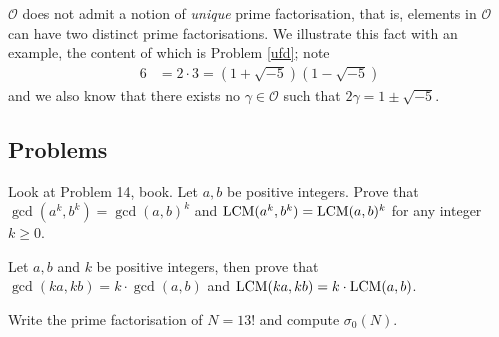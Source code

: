 
$\mathscr{O}$ does not admit a notion of \emph{unique} prime factorisation, that is, elements in $\mathscr{O}$ can have two distinct prime factorisations. We illustrate this fact with an example, the content of which is Problem \ref{ufd}; note
\begin{align*}
6 &= 2\cdot 3 = (1 + \sqrt{-5})(1- \sqrt{-5})
\end{align*}
and we also know that there exists no $\gamma \in \mathscr{O}$ such that $2\gamma = 1 \pm \sqrt{-5}$.

\vspace*{0.5in}

\subsection{Problems}
\vspace{0.1in}

\begin{problem}\label{problem 3.1}
Look at Problem 14, book.
Let $a,b$ be positive integers. Prove that $\gcd(a^k,b^k) = \gcd(a,b)^k$ and $\operatorname{LCM}(a^k,b^k) = \operatorname{LCM}(a,b)^k$ for any integer $k \geq 0$.
\end{problem}

\vspace*{0.1in}

\begin{problem}\label{problem 3.2}
Let $a,b$ and $k$ be positive integers, then prove that $\gcd(ka,kb) = k\cdot \gcd(a,b)$ and $\operatorname{LCM}(ka,kb) = k\cdot \operatorname{LCM}(a,b)$.
\end{problem}

\vspace*{0.1in}

\begin{problem}\label{problem 3.3}
Write the prime factorisation of $N = 13!$ and compute $\sigma_0(N)$.
\end{problem}

\vspace*{0.1in}

